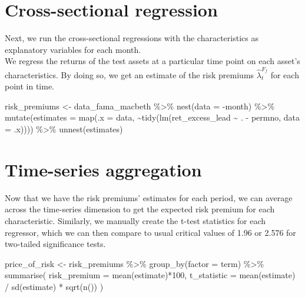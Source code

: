 \documentclass[
]{krantz}
\newenvironment{Shaded}{\begin{snugshade}}{\end{snugshade}}
\newcommand{\AttributeTok}[1]{\textcolor[rgb]{0.61,0.61,0.61}{#1}}
\newcommand{\DecValTok}[1]{\textcolor[rgb]{0.06,0.06,0.06}{#1}}
\newcommand{\FunctionTok}[1]{\textcolor[rgb]{0,0,0}{#1}}
\newcommand{\NormalTok}[1]{#1}
\newcommand{\OtherTok}[1]{\textcolor[rgb]{0.37,0.37,0.37}{#1}}
\newcommand{\SpecialCharTok}[1]{\textcolor[rgb]{0,0,0}{#1}}
\begin{document}
\hypertarget{cross-sectional-regression}{%
\section{Cross-sectional regression}\label{cross-sectional-regression}}

Next, we run the cross-sectional regressions with the characteristics as explanatory variables for each month.\\
We regress the returns of the test assets at a particular time point on each asset's characteristics.
By doing so, we get an estimate of the risk premiums \(\hat\lambda^{F_f}_t\) for each point in time.

\begin{Shaded}
\begin{Highlighting}[]
\NormalTok{risk\_premiums }\OtherTok{\textless{}{-}}\NormalTok{ data\_fama\_macbeth }\SpecialCharTok{\%\textgreater{}\%}
  \FunctionTok{nest}\NormalTok{(}\AttributeTok{data =} \SpecialCharTok{{-}}\NormalTok{month) }\SpecialCharTok{\%\textgreater{}\%} 
  \FunctionTok{mutate}\NormalTok{(}\AttributeTok{estimates =} \FunctionTok{map}\NormalTok{(}\AttributeTok{.x =}\NormalTok{ data, }
                         \SpecialCharTok{\textasciitilde{}}\FunctionTok{tidy}\NormalTok{(}\FunctionTok{lm}\NormalTok{(ret\_excess\_lead }\SpecialCharTok{\textasciitilde{}}\NormalTok{ . }\SpecialCharTok{{-}}\NormalTok{ permno, }\AttributeTok{data =}\NormalTok{ .x)))) }\SpecialCharTok{\%\textgreater{}\%} 
  \FunctionTok{unnest}\NormalTok{(estimates)}
\end{Highlighting}
\end{Shaded}

\hypertarget{time-series-aggregation}{%
\section{Time-series aggregation}\label{time-series-aggregation}}

Now that we have the risk premiums' estimates for each period, we can average across the time-series dimension to get the expected risk premium for each characteristic. Similarly, we manually create the t-test statistics for each regressor, which we can then compare to usual critical values of 1.96 or 2.576 for two-tailed significance tests.

\begin{Shaded}
\begin{Highlighting}[]
\NormalTok{price\_of\_risk }\OtherTok{\textless{}{-}}\NormalTok{ risk\_premiums }\SpecialCharTok{\%\textgreater{}\%}
  \FunctionTok{group\_by}\NormalTok{(}\AttributeTok{factor =}\NormalTok{ term) }\SpecialCharTok{\%\textgreater{}\%}
  \FunctionTok{summarise}\NormalTok{(}
    \AttributeTok{risk\_premium =} \FunctionTok{mean}\NormalTok{(estimate)}\SpecialCharTok{*}\DecValTok{100}\NormalTok{,}
    \AttributeTok{t\_statistic =} \FunctionTok{mean}\NormalTok{(estimate) }\SpecialCharTok{/} \FunctionTok{sd}\NormalTok{(estimate) }\SpecialCharTok{*} \FunctionTok{sqrt}\NormalTok{(}\FunctionTok{n}\NormalTok{())}
\NormalTok{  )}
\end{Highlighting}
\end{Shaded}
\end{document}
